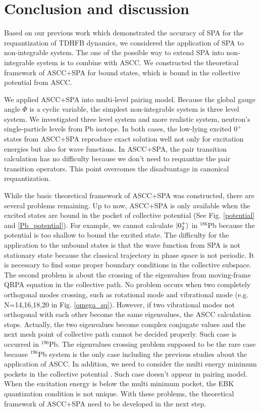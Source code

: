 \documentclass[%
superscriptaddress,
showpacs,
nofootinbib,
amsmath,amssymb,
aps,
prc,
twocolumn,
floatfix ]%
{revtex4-1}
\begin{document}

\section{Conclusion and discussion}
\label{sec5}
Based on our previous work which demonstrated the accuracy of SPA for the requantization of TDHFB dynamics, we considered the application of SPA to non-integrable system. The one of the possible way to extend SPA into non-integrable system is to combine with ASCC. We constructed the theoretical framework of ASCC+SPA for bound states, which is bound in the collective potential from ASCC. 

We applied ASCC+SPA into multi-level pairing model. Because the global gauge angle $\Phi$ is a cyclic variable, the simplest non-integrable system is three level system. We investigated three level system and more realistic system, neutron's single-particle levels from Pb isotope. In both cases, the low-lying excited $0^+$ states from ASCC+SPA reproduce exact solution well not only for excitation energies but also for wave functions. In ASCC+SPA, the pair transition calculation has no difficulty because we don't need to requantize the pair transition operators. This point overcomes the disadvantage in canonical requantization.

While the basic theoretical framework of ASCC+SPA was constructed, there are several problems remaining. Up to now, ASCC+SPA is only available when the excited states are bound in the pocket of collective potential (See Fig. \ref{potential} and \ref{Pb_potential}). For example, we cannot calculate $\ket{0_2^+}$ in ${}^{186}$Pb because the potential is too shallow to bound the excited state. The difficulty for the application to the unbound states is that the wave function from SPA is not stationary state because the classical trajectory in phase space is not periodic. It is necessary to find some proper boundary conditions in the collective subspace. The second problem is about the crossing of the eigenvalues from moving-frame QRPA equation in the collective path. No problem occurs when two completely orthogonal modes crossing, such as rotational mode and vibrational mode (e.g. N=14,16,18,20 in Fig. \ref{omega_sq}). However, if two vibrational modes not orthogonal with each other become the same eigenvalues, the ASCC calculation stops. Actually, the two eigenvalues become complex conjugate values and the next mesh point of collective path cannot be decided properly. Such case is occurred in ${}^{196}$Pb. The eigenvalues crossing problem supposed to be the rare case because ${}^{196}$Pb system is the only case including the previous studies about the application of ASCC. In addition, we need to consider the multi energy minimum pockets in the collective potential \cite{HNMM07, HNMM08}. Such case doesn't appear in pairing model. When the excitation energy is below the multi minimum pocket, the EBK quantization condition is not unique. With these problems, the theoretical framework of ASCC+SPA need to be developed in the next step.
\end{document}
